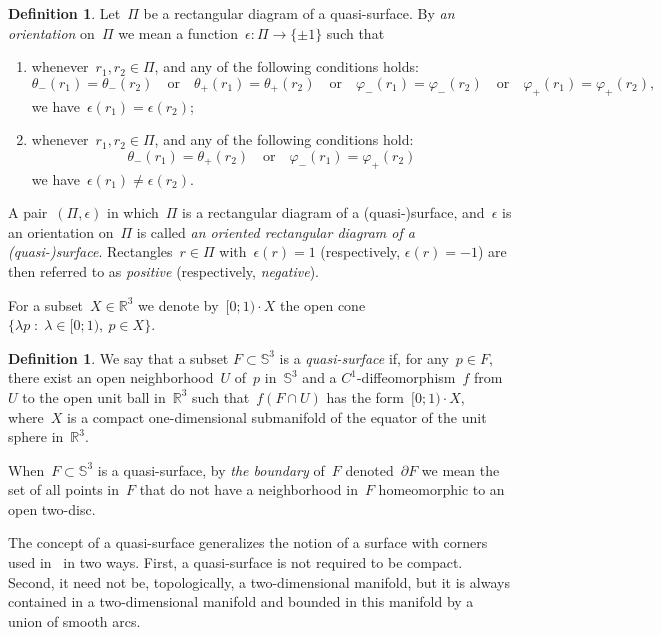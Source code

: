 \documentclass{amsart}
\theoremstyle{theorem}
\theoremstyle{remark}
\theoremstyle{definition}
\newtheorem{defi}[theo]{Definition}
\numberwithin{equation}{section}
\numberwithin{figure}{section}
\begin{document}
\begin{defi}
Let~$\Pi$ be a rectangular diagram of a quasi-surface. By \emph{an orientation} on~$\Pi$ we mean
a function~$\epsilon:\Pi\to \{\pm 1\}$ such that
\begin{enumerate}
\item[(i)]
whenever~$r_1,r_2\in\Pi$, and any of the following conditions holds:
\begin{equation}\label{orientation1-eq}
\theta_-(r_1)=\theta_-(r_2)\quad\text{or}\quad
\theta_+(r_1)=\theta_+(r_2)\quad\text{or}\quad
\varphi_-(r_1)=\varphi_-(r_2)\quad\text{or}\quad
\varphi_+(r_1)=\varphi_+(r_2),
\end{equation}
we have~$\epsilon(r_1)=\epsilon(r_2)$;
\item[(ii)]
whenever~$r_1,r_2\in\Pi$, and any of the following conditions hold:
\begin{equation}\label{orientation2-eq}
\theta_-(r_1)=\theta_+(r_2)\quad\text{or}\quad
\varphi_-(r_1)=\varphi_+(r_2)
\end{equation}
we have~$\epsilon(r_1)\ne\epsilon(r_2)$.
\end{enumerate}
A pair~$(\Pi,\epsilon)$ in which~$\Pi$ is a rectangular diagram of a (quasi-)surface, and~$\epsilon$ is an
orientation on~$\Pi$ is called \emph{an oriented rectangular diagram of a \emph(quasi-\emph)surface}.
Rectangles~$r\in\Pi$ with~$\epsilon(r)=1$ (respectively, $\epsilon(r)=-1$) are then referred to as \emph{positive}
(respectively, \emph{negative}).
\end{defi}

For a subset~$X\in\mathbb R^3$ we denote by~$[0;1)\cdot X$ the open cone~$\{\lambda p\;:\;\lambda\in[0;1),\ p\in X\}$.

\begin{defi}\label{quasi-surf-def}
We say that a subset $F\subset \mathbb S^3$ is a \emph{quasi-surface} if, for any~$p\in F$, there exist
an open neighborhood~$U$ of~$p$ in~$\mathbb S^3$ and a $C^1$-diffeomorphism~$f$ from~$U$
to the open unit ball in~$\mathbb R^3$ such that~$f(F\cap U)$ has the form~$[0;1)\cdot X$,
where~$X$ is a compact one-dimensional submanifold of the equator of the unit sphere in~$\mathbb R^3$.

When~$F\subset\mathbb S^3$ is a quasi-surface, by \emph{the boundary} of~$F$ denoted~$\partial F$
we mean the set of all points in~$F$ that do not have a neighborhood in~$F$ homeomorphic to an open two-disc.
\end{defi}


The concept of a quasi-surface generalizes the notion of a surface with corners used in~\cite{Representability}
in two ways. First, a quasi-surface is not required to be compact. Second, it need not be, topologically, a two-dimensional
manifold, but it is always contained in a two-dimensional manifold and bounded in this manifold by a
union of smooth arcs.
\end{document}
